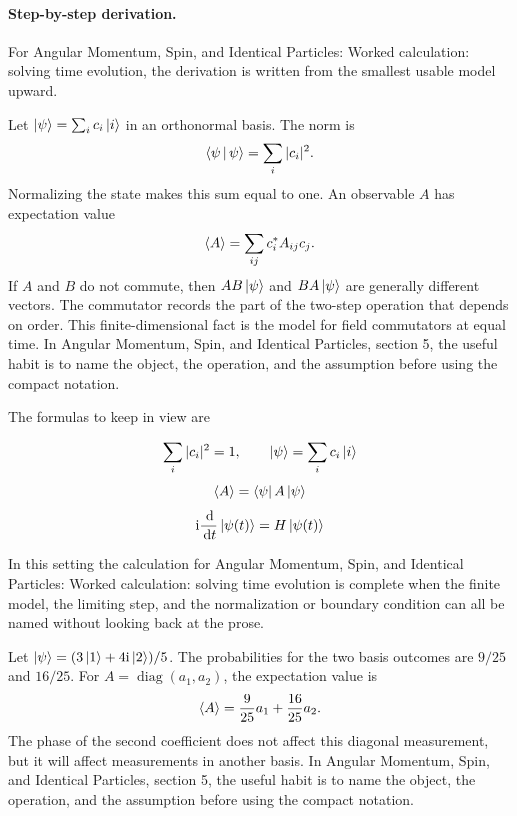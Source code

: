 \paragraph{Step-by-step derivation.}

For Angular Momentum, Spin, and Identical Particles: Worked calculation: solving time evolution, the derivation is written from the smallest usable model upward.

Let \(\left|\psi\right\rangle=\sum_i c_i\left|i\right\rangle\) in an orthonormal basis.  The norm is
\[
  \left\langle \psi\,\middle|\,\psi\right\rangle=\sum_i |c_i|^2.
\]
Normalizing the state makes this sum equal to one.  An observable \(A\) has expectation value
\[
  \left\langle A\right\rangle=\sum_{ij}c_i^*A_{ij}c_j.
\]
If \(A\) and \(B\) do not commute, then \(AB\left|\psi\right\rangle\) and \(BA\left|\psi\right\rangle\) are generally different vectors.  The commutator records the part of the two-step operation that depends on order.  This finite-dimensional fact is the model for field commutators at equal time.  In Angular Momentum, Spin, and Identical Particles, section 5, the useful habit is to name the object, the operation, and the assumption before using the compact notation.

The formulas to keep in view are

\[
  \sum_i |c_i|^2=1,\qquad \left|\psi\right\rangle=\sum_i c_i\left|i\right\rangle
\]
\[
  \left\langle A\right\rangle=\left\langle \psi\right|A\left|\psi\right\rangle
\]
\[
  \mathrm i\frac{\,\mathrm d}{\,\mathrm d t}\left|\psi(t)\right\rangle=H\left|\psi(t)\right\rangle
\]

In this setting the calculation for Angular Momentum, Spin, and Identical Particles: Worked calculation: solving time evolution is complete when the finite model, the limiting step, and the normalization or boundary condition can all be named without looking back at the prose.




\begin{example}
Let \(\left|\psi\right\rangle=(3\left|1\right\rangle+4\mathrm i\left|2\right\rangle)/5\).  The probabilities for the two basis outcomes are \(9/25\) and \(16/25\).  For \(A=\operatorname{diag}(a_1,a_2)\), the expectation value is
\[
  \left\langle A\right\rangle=\frac{9}{25}a_1+\frac{16}{25}a_2.
\]
The phase of the second coefficient does not affect this diagonal measurement, but it will affect measurements in another basis.  In Angular Momentum, Spin, and Identical Particles, section 5, the useful habit is to name the object, the operation, and the assumption before using the compact notation.
\end{example}



